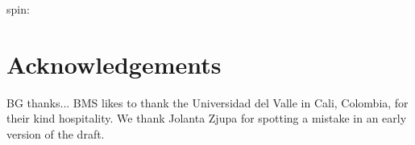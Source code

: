 \documentclass[a4paper,fleqn,usenatbib]{mnras}
\begin{document}
spin:\citep{bailin_internal_2005,dubinski_cosmological_1992,goldberg_spins_1967,pahwa_alignment_2016,paz_angular_2008,peebles_origin_1969,schafer_galactic_2012,white_angular_1984}




\section*{Acknowledgements}
BG thanks...   BMS likes to thank the Universidad del Valle in Cali, Colombia, for their kind hospitality. We thank Jolanta Zjupa for spotting a mistake in an early version of the draft.






\bsp
\label{lastpage}
\end{document}
